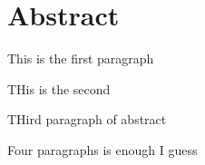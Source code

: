 \chapter*{Abstract}
\mbox{}\par
This is the first paragraph
\par
THis is the second 
\par
THird paragraph of abstract
\par 
Four paragraphs is enough I guess 
